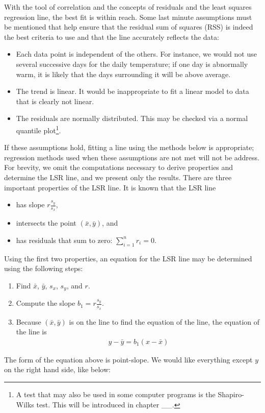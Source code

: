 With the tool of correlation and the concepts of residuals and the least squares regression line, the best fit is within reach. Some last minute assumptions must be mentioned that help ensure that the residual sum of squares (RSS) is indeed the best criteria to use and that the line accurately reflects the data:
\begin{itemize}
\item Each data point is independent of the others. For instance, we would not use several successive days for the daily temperature; if one day is abnormally warm, it is likely that the days surrounding it will be above average.
\item The trend is linear. It would be inappropriate to fit a linear model to data that is clearly not linear.
\item The residuals are normally distributed. This may be checked via a normal quantile plot\footnote{A test that may also be used in some computer programs is the Shapiro-Wilks test. This will be introduced in chapter \_\_.}.
\end{itemize}
If these assumptions hold, fitting a line using the methods below is appropriate; regression methods used when these assumptions are not met will not be address. For brevity, we omit the computations necessary to derive properties and determine the LSR line, and we present only the results. There are three important properties of the LSR line. It is known that the LSR line
\begin{itemize}
\item has slope $r\frac{s_y}{s_x}$,
\item intersects the point $(\bar{x},\bar{y})$, and
\item has residuals that sum to zero: $\sum_{i=1}^nr_i = 0$.
\end{itemize}
Using the first two properties, an equation for the LSR line may be determined using the following steps:
\begin{enumerate}
\item Find $\bar{x}$, $\bar{y}$, $s_x$, $s_y$, and $r$.
\item Compute the slope $b_1 = r\frac{s_y}{s_x}$.
\item Because $(\bar{x},\bar{y})$ is on the line to find the equation of the line, the equation of the line is
	\begin{eqnarray*}
	y - \bar{y} = b_1(x - \bar{x})
	\end{eqnarray*}
\end{enumerate}
The form of the equation above is point-slope. We would like everything except $y$ on the right hand side, like below:
